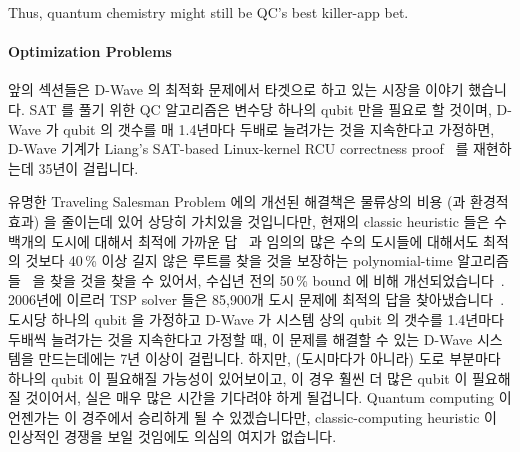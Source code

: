 Thus, quantum chemistry might still be QC's best killer-app bet.
\fi

\paragraph{Optimization Problems}
\label{sec:future:Optimization Problems}

앞의 섹션들은 D-Wave 의 최적화 문제에서 타겟으로 하고 있는 시장을 이야기
했습니다.
SAT 를 풀기 위한 QC 알고리즘은 변수당 하나의 qubit 만을 필요로 할 것이며,
D-Wave 가 qubit 의 갯수를 매 1.4년마다 두배로 늘려가는 것을 지속한다고
가정하면, D-Wave 기계가 Liang's SAT-based Linux-kernel RCU correctness
proof~\cite{LihaoLiang2016VerifyTreeRCU} 를 재현하는데 35년이 걸립니다.

유명한 Traveling Salesman Problem 에의 개선된 해결책은 물류상의 비용 (과 환경적
효과) 을 줄이는데 있어 상당히 가치있을 것입니다만, 현재의 classic heuristic
들은 수백개의 도시에 대해서 최적에 가까운
답~\cite{Martin:1992:LMC:2307953.2308141} 과 임의의 많은 수의 도시들에 대해서도
최적의 것보다 40\,\% 이상 길지 않은 루트를 찾을 것을 보장하는 polynomial-time
알고리즘들~\cite{Sebo:2014:STN:2688265.2688281} 을 찾을 것을 찾을 수 있어서,
수십년 전의 50\,\% bound 에 비해
개선되었습니다~\cite{NicosChristofides1976TSP-FiftyPercent}.
2006년에 이르러 TSP solver 들은 85,900개 도시 문제에 최적의 답을
찾아냈습니다~\cite{DLApplegate2007TSPtextbook}.
도시당 하나의 qubit 을 가정하고 D-Wave 가 시스템 상의 qubit 의 갯수를 1.4년마다
두배씩 늘려가는 것을 지속한다고 가정할 때, 이 문제를 해결할 수 있는 D-Wave
시스템을 만드는데에는 7년 이상이 걸립니다.
하지만, (도시마다가 아니라) 도로 부분마다 하나의 qubit 이 필요해질 가능성이
있어보이고, 이 경우 훨씬 더 많은 qubit 이 필요해질 것이어서, 실은 매우 많은
시간을 기다려야 하게 될겁니다.
Quantum computing 이 언젠가는 이 경주에서 승리하게 될 수 있겠습니다만,
classic-computing heuristic 이 인상적인 경쟁을 보일 것임에도 의심의 여지가
없습니다.
\iffalse

